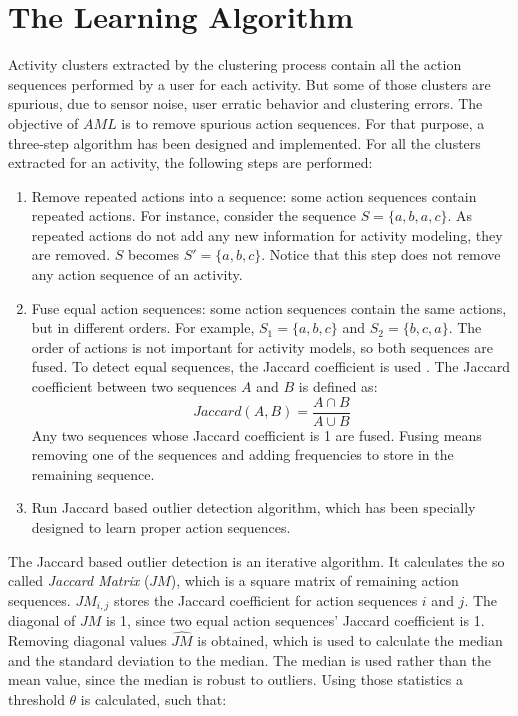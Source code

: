 \section{The Learning Algorithm}
\label{sec:learner:algorithm}

Activity clusters extracted by the clustering process contain all the action sequences performed by a user for each activity. But some of those clusters are spurious, due to sensor noise, user erratic behavior and clustering errors. The objective of $AML$ is to remove spurious action sequences. For that purpose, a three-step algorithm has been designed and implemented. For all the clusters extracted for an activity, the following steps are performed:

\begin{enumerate}
 \item Remove repeated actions into a sequence: some action sequences contain repeated actions. For instance, consider the sequence $S=\{a, b, a, c\}$. As repeated actions do not add any new information for activity modeling, they are removed. $S$ becomes $S' = \{a, b, c\}$. Notice that this step does not remove any action sequence of an activity.
 \item Fuse equal action sequences: some action sequences contain the same actions, but in different orders. For example, $S_1 = \{a, b, c \}$ and $S_2 = \{b, c, a\}$. The order of actions is not important for activity models, so both sequences are fused. To detect equal sequences, the Jaccard coefficient is used \cite{A.K.Jain1988}. The Jaccard coefficient between two sequences $A$ and $B$ is defined as:
 \begin{equation}
  Jaccard(A, B) = \frac{A \cap B}{A \cup B}
 \end{equation}
Any two sequences whose Jaccard coefficient is 1 are fused. Fusing means removing one of the sequences and adding frequencies to store in the remaining sequence.
 \item Run Jaccard based outlier detection algorithm, which has been specially designed to learn proper action sequences.
\end{enumerate}

The Jaccard based outlier detection is an iterative algorithm. It calculates the so called \textit{Jaccard Matrix} ($JM$), which is a square matrix of remaining action sequences. $JM_{i, j}$ stores the Jaccard coefficient for action sequences $i$ and $j$. The diagonal of $JM$ is 1, since two equal action sequences' Jaccard coefficient is 1. Removing diagonal values $\hat{JM}$ is obtained, which is used to calculate the median and the standard deviation to the median. The median is used rather than the mean value, since the median is robust to outliers. Using those statistics a threshold $\theta$ is calculated, such that:

